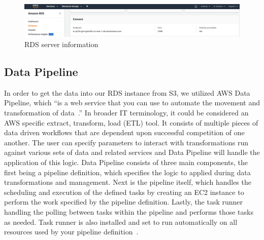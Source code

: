 \begin{figure}[!ht]
  \centering\includegraphics[width=\columnwidth]{images/rds.png}
  \caption{RDS server information}\label{f:rds}
\end{figure} 

\subsection{Data Pipeline}

In order to get the data into our RDS instance from S3, we utilized AWS Data 
Pipeline, which ``is a web service that you can use to automate the movement 
and transformation of data~\cite{hid-sp18-521-whatisdatapipeline}.'' In 
broader IT terminology, it could be considered an AWS specific extract, 
transform, load (ETL) tool. It consists of multiple pieces of data driven 
workflows that are dependent upon successful competition of one another. 
The user can specify parameters to interact with transformations run against 
various sets of data and related services and Data Pipeline will handle the 
application of this logic. Data Pipeline consists of three main components, 
the first being a pipeline definition, which specifies the logic to applied 
during data transformations and management. Next is the pipeline itself, which 
handles the scheduling and execution of the defined tasks by creating an EC2 
instance to perform the work specified by the pipeline definition. Lastly, 
the task runner handling the polling between tasks within the pipeline and 
performs those tasks as needed. Task runner is also installed and set to run 
automatically on all resources used by your pipeline 
definition~\cite{hid-sp18-521-whatisdatapipeline}. 

